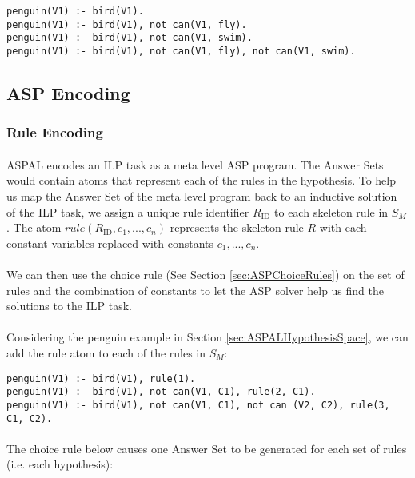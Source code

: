 \documentclass{article}
\theoremstyle{plain}
\theoremstyle{definition}
\begin{document}
\begin{multicols}{2}
\begin{lstlisting}
penguin(V1) :- bird(V1).
penguin(V1) :- bird(V1), not can(V1, fly).
penguin(V1) :- bird(V1), not can(V1, swim).
penguin(V1) :- bird(V1), not can(V1, fly), not can(V1, swim).
\end{lstlisting}

\subsection{ASP Encoding}

\subsubsection{Rule Encoding}

\paragraph{} ASPAL encodes an ILP task as a meta level ASP program. The Answer Sets would contain atoms that represent each of the rules in the hypothesis. To help us map the Answer Set of the meta level program back to an inductive solution of the ILP task, we assign a unique rule identifier $R_\text{ID}$ to each skeleton rule in $S_M$. The atom $rule(R_\text{ID}, c_1, ..., c_n)$ represents the skeleton rule $R$ with each constant variables replaced with constants $c_1, ..., c_n$.

\paragraph{} We can then use the choice rule (See Section \ref{sec:ASPChoiceRules}) on the set of rules and the combination of constants to let the ASP solver help us find the solutions to the ILP task.

\paragraph{} Considering the penguin example in Section \ref{sec:ASPALHypothesisSpace}, we can add the rule atom to each of the rules in $S_M$:

\begin{lstlisting}
penguin(V1) :- bird(V1), rule(1).
penguin(V1) :- bird(V1), not can(V1, C1), rule(2, C1).
penguin(V1) :- bird(V1), not can(V1, C1), not can (V2, C2), rule(3, C1, C2).
\end{lstlisting}

\paragraph{} The choice rule below causes one Answer Set to be generated for each set of rules (i.e. each hypothesis):


\end{multicols}
\end{document}
